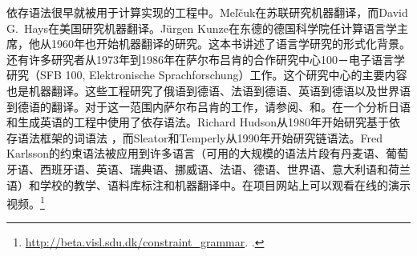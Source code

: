 依存语法很早就被用于计算实现的工程中。Meľčuk在苏联研究机器翻译，而David G.\ Hays在美国研究机器翻译。Jürgen Kunze在东德的德国科学院任计算语言学主席，他从1960年也开始机器翻译的研究。这本书讲述了语言学研究的形式化背景。还有许多研究者从1973年到1986年在萨尔布吕肯的合作研究中心100－电子语言学研究（SFB 100, Elektronische Sprachforschung）工作。这个研究中心的主要内容也是机器翻译。这些工程研究了俄语到德语、法语到德语、英语到德语以及世界语到德语的翻译。对于这一范围内萨尔布吕肯的工作，请参阅、和。\citet{MIF85a}在一个分析日语和生成英语的工程中使用了依存语法。Richard Hudson从1980年开始研究基于依存语法框架的词语法\indexwgc\citep{Hudson84a-u,Hudson2007a-u} ，而Sleator和Temperly从1990年开始研究链语法\citep{ST91a-u,GLS95a-u}。Fred Karlsson的约束语法\citeyearpar{Karlsson90a-u}被应用到许多语言（可用的大规模的语法片段有丹麦语、葡萄牙语、西班牙语、英语、瑞典语、挪威语、法语、德语、世界语、意大利语和荷兰语）和学校的教学、语料库标注和机器翻译中。在项目网站上可以观看在线的演示视频。\footnote{
  \url{http://beta.visl.sdu.dk/constraint_grammar}. .
}

